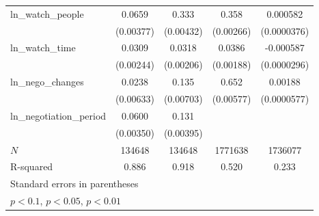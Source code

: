 {\begin{tabular}{l*{4}{c}}
ln\_watch\_people&      0.0659\sym{***}&       0.333\sym{***}&       0.358\sym{***}&    0.000582\sym{***}\\
            &   (0.00377)         &   (0.00432)         &   (0.00266)         & (0.0000376)         \\
\addlinespace
ln\_watch\_time&      0.0309\sym{***}&      0.0318\sym{***}&      0.0386\sym{***}&   -0.000587\sym{***}\\
            &   (0.00244)         &   (0.00206)         &   (0.00188)         & (0.0000296)         \\
\addlinespace
ln\_nego\_changes&      0.0238\sym{***}&       0.135\sym{***}&       0.652\sym{***}&     0.00188\sym{***}\\
            &   (0.00633)         &   (0.00703)         &   (0.00577)         & (0.0000577)         \\
\addlinespace
ln\_negotiation\_period&      0.0600\sym{***}&       0.131\sym{***}&                     &                     \\
            &   (0.00350)         &   (0.00395)         &                     &                     \\
\midrule
\(N\)       &      134648         &      134648         &     1771638         &     1736077         \\
R-squared   &       0.886         &       0.918         &       0.520         &       0.233         \\
\bottomrule
\multicolumn{5}{l}{\footnotesize Standard errors in parentheses}\\
\multicolumn{5}{l}{\footnotesize \sym{*} \(p<0.1\), \sym{**} \(p<0.05\), \sym{***} \(p<0.01\)}\\
\end{tabular}
}

